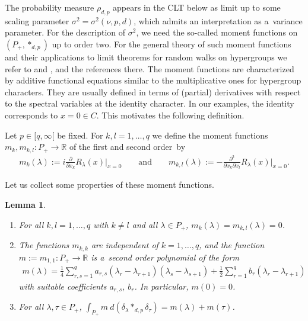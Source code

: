 \documentclass[11pt]{article}
\numberwithin{equation}{section}
\newtheorem{Lemma}[Theorem]{Lemma}
\begin{document}
The probability measure $\rho_{d,p}$ appears in the CLT below as limit up to some scaling parameter
$\sigma^2=\sigma^2(\nu,p,d)$, which admits an interpretation as a~variance parameter.
For the description of $\sigma^2$, we need the so-called moment functions on $(P_+,*_{d,p})$ up to order two.
For the general theory of such moment functions and their applications to limit theorems for random walks on hypergroups
we refer to \cite[Chapter~7]{BH} and \cite{Z}, and the references there.
The moment functions are characterized by additive functional equations similar to the multiplicative ones for
hypergroup characters.
They are usually def\/ined in terms of (partial) derivatives with respect to the spectral variables at the identity
character.
In our examples, the identity corresponds to $x=0\in C$.
This motivates the following def\/inition.

\begin{Definition}
Let $p\in[q,\infty[$ be f\/ixed.
For $k,l=1,\ldots,q$ we def\/ine the moment functions $m_k, m_{k,l}: P_+\to\mathbb R$ of the f\/irst and second order~by
\begin{gather*}
m_k(\lambda):= i  \frac{\partial}{\partial x_k} R_\lambda(x)\bigg|_{x=0}
\qquad
\text{and}
\qquad
m_{k,l}(\lambda):= -\frac{\partial^2}{\partial x_k\partial x_l} R_\lambda(x)\bigg|_{x=0}.
\end{gather*}
\end{Definition}

\noindent Let us collect some properties of these moment functions.

\begin{Lemma}\label{basic-prop-moment}\quad
\begin{enumerate}\itemsep=0pt
\item[$(1)$]
For all $k,l=1,\ldots,q$ with $k\ne l$ and all $\lambda\in P_+$, $m_k(\lambda)= m_{k,l}(\lambda)=0$.
\item[$(2)$]
The functions $m_{k,k}$ are independent of $k=1,\ldots,q$, and the function $m:=m_{1,1}: P_+\to\mathbb
R$ is a~second order polynomial of the form
\begin{gather*}
m(\lambda)
=\frac{1}{4}\sum\limits_{r,s=1}^q a_{r,s}
 (\lambda_r-\lambda_{r+1})(\lambda_s-\lambda_{s+1}) +\frac{1}{2} \sum\limits_{r=1}^q b_r (\lambda_r-\lambda_{r+1})
\end{gather*}
with suitable coefficients $a_{r,s}$, $b_r$.
In particular, $m(0)=0$.
\item[$(3)$]
For all $\lambda,\tau\in P_+$, $\int_{P_+} m\> d(\delta_\lambda*_{d,p}\delta_\tau)= m(\lambda)+m(\tau)$.
\end{enumerate}
\end{Lemma}
\end{document}
